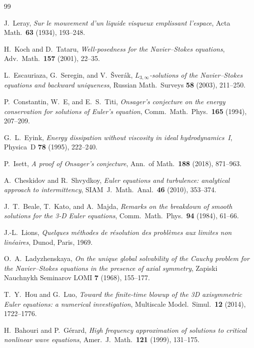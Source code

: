 \documentclass[11pt]{article}
\begin{document}
\begin{thebibliography}{99}

J.~Leray,
\textit{Sur le mouvement d'un liquide visqueux emplissant l'espace},
Acta Math.\ \textbf{63} (1934), 193--248.

H.~Koch and D.~Tataru,
\textit{Well-posedness for the Navier--Stokes equations},
Adv.\ Math.\ \textbf{157} (2001), 22--35.

L.~Escauriaza, G.~Seregin, and V.~\v{S}ver\'ak,
\textit{$L_{3,\infty}$-solutions of the Navier--Stokes equations
and backward uniqueness},
Russian Math.\ Surveys \textbf{58} (2003), 211--250.

P.~Constantin, W.~E, and E.~S.~Titi,
\textit{Onsager's conjecture on the energy conservation
for solutions of Euler's equation},
Comm.\ Math.\ Phys.\ \textbf{165} (1994), 207--209.

G.~L.~Eyink,
\textit{Energy dissipation without viscosity in ideal hydrodynamics~I},
Physica~D \textbf{78} (1995), 222--240.

P.~Isett,
\textit{A proof of Onsager's conjecture},
Ann.\ of Math.\ \textbf{188} (2018), 871--963.

A.~Cheskidov and R.~Shvydkoy,
\textit{Euler equations and turbulence: analytical approach
to intermittency},
SIAM~J.\ Math.\ Anal.\ \textbf{46} (2010), 353--374.

J.~T.~Beale, T.~Kato, and A.~Majda,
\textit{Remarks on the breakdown of smooth solutions for the
3-D Euler equations},
Comm.\ Math.\ Phys.\ \textbf{94} (1984), 61--66.

J.-L.~Lions,
\textit{Quelques m\'ethodes de r\'esolution des probl\`emes
aux limites non lin\'eaires},
Dunod, Paris, 1969.

O.~A.~Ladyzhenskaya,
\textit{On the unique global solvability of the Cauchy problem
for the Navier--Stokes equations in the presence of axial symmetry},
Zapiski Nauchnykh Seminarov LOMI \textbf{7} (1968), 155--177.

T.~Y.~Hou and G.~Luo,
\textit{Toward the finite-time blowup of the 3D axisymmetric
Euler equations: a numerical investigation},
Multiscale Model.\ Simul.\ \textbf{12} (2014), 1722--1776.

H.~Bahouri and P.~G\'erard,
\textit{High frequency approximation of solutions to critical
nonlinear wave equations},
Amer.\ J.\ Math.\ \textbf{121} (1999), 131--175.


\end{thebibliography}
\end{document}
